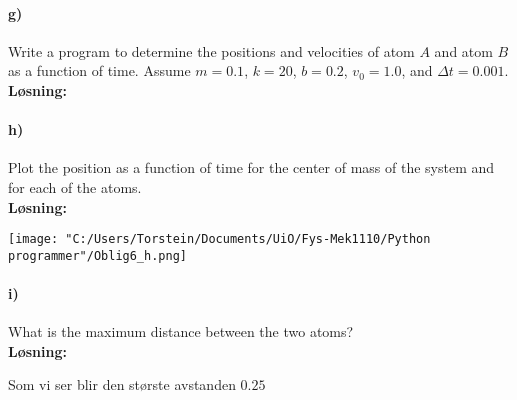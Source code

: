 \documentclass[11pt, A4paper,norsk]{article}
\begin{document}
		\paragraph{g)}
			\begin{flushleft}
Write a program to determine the positions and velocities of atom $A$ and atom $B$ as a function of time. Assume $m = 0.1$, $k = 20$, $b = 0.2$, $v_0 = 1.0$, and $\Delta t = 0.001$. \\
\vspace{1mm}
\textbf{Løsning:} \\
\vspace{1mm}

			\end{flushleft}









		\paragraph{h)}
			\begin{flushleft}
Plot the position as a function of time for the center of mass of the system and for each of the atoms. \\
\vspace{1mm}
\textbf{Løsning:} \\
\vspace{1mm}

\texttt{[image: "C:/Users/Torstein/Documents/UiO/Fys-Mek1110/Python programmer"/Oblig6\_h.png]}
			\end{flushleft}












		\paragraph{i)}
			\begin{flushleft}
What is the maximum distance between the two atoms? \\
\vspace{1mm}
\textbf{Løsning:} \\
\vspace{1mm}

Som vi ser blir den største avstanden $0.25$
			\end{flushleft}
\end{document}
